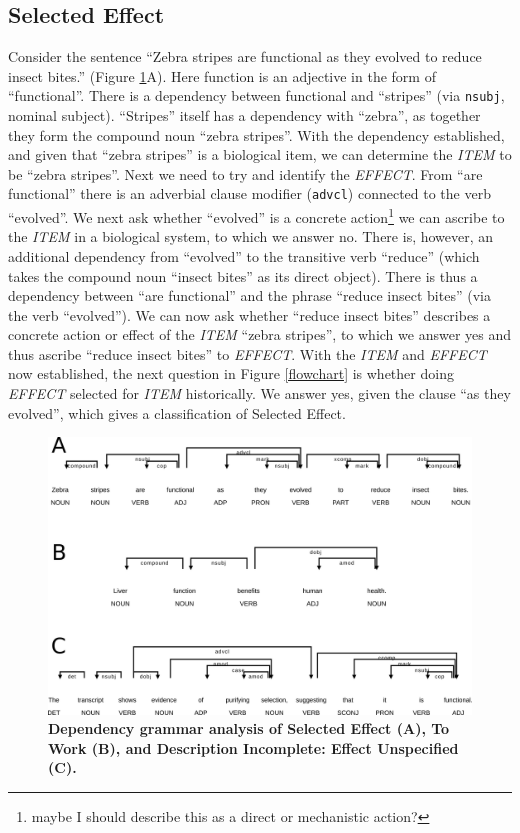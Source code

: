 \documentclass{article}
\begin{document}
\subsection{Selected Effect}
\label{sec:selected-effect}

Consider the sentence ``Zebra stripes are functional as they evolved to reduce insect bites.'' (Figure \ref{seleff_towork_effunsp}A).
Here function is an adjective in the form of ``functional''.
There is a dependency between functional and ``stripes'' (via \texttt{nsubj}, nominal subject).
``Stripes'' itself has a dependency with ``zebra'', as together they form the compound noun ``zebra stripes''.
With the dependency established, and given that ``zebra stripes'' is a biological item, we can determine the \emph{ITEM} to be ``zebra stripes''.
Next we need to try and identify the \emph{EFFECT}.
From ``are functional'' there is an adverbial clause modifier (\texttt{advcl}) connected to the verb ``evolved''.
We next ask whether ``evolved'' is a concrete action\footnote{maybe I should describe this as a direct or mechanistic action?} we can ascribe to the \emph{ITEM} in a biological system, to which we answer no.
There is, however, an additional dependency from ``evolved'' to the transitive verb ``reduce'' (which takes the compound noun ``insect bites'' as its direct object).
There is thus a dependency between ``are functional'' and the phrase ``reduce insect bites'' (via the verb ``evolved'').
We can now ask whether ``reduce insect bites'' describes a concrete action or effect of the \emph{ITEM} ``zebra stripes'', to which we answer yes and thus ascribe ``reduce insect bites'' to \emph{EFFECT}.
With the \emph{ITEM} and \emph{EFFECT} now established, the next question in Figure \ref{flowchart} is whether doing \emph{EFFECT} selected for \emph{ITEM} historically.
We answer yes, given the clause ``as they evolved'', which gives a classification of Selected Effect.


\begin{figure}[ht]
  \centering
  \includegraphics[width=\linewidth]{figures/combined_seleff_towork_effunsp.png}
  \caption[]{\textbf{Dependency grammar analysis of Selected Effect (A), To Work (B), and Description Incomplete: Effect Unspecified (C).}}
  \label{seleff_towork_effunsp}
\end{figure}
\end{document}
